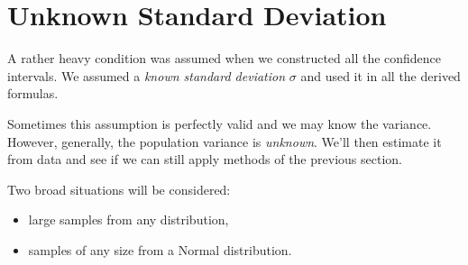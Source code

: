 \section{Unknown Standard Deviation}
\label{sec:unknown-standard-deviation}

A rather heavy condition was assumed when we constructed all the confidence intervals. We assumed a \textit{known standard deviation} $\sigma$ and used it in all the derived formulas.

Sometimes this assumption is perfectly valid and we may know the variance. However, generally, the population variance is \textit{unknown}. We'll then estimate it from data and see if we can still apply methods of the previous section.

Two broad situations will be considered:
\begin{itemize}
  \item large samples from any distribution,
  \item samples of any size from a Normal distribution.
\end{itemize}










